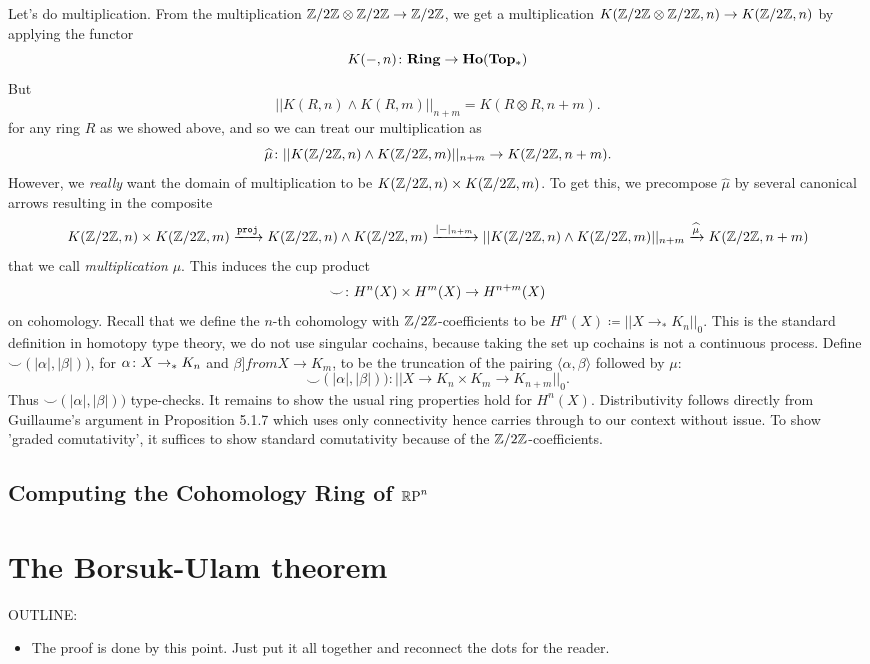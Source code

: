 \documentclass{amsart}
\begin{document}
Let's do
multiplication. From the multiplication
$ \mathbb{Z}/2\mathbb{Z} \otimes \mathbb{Z}/2\mathbb{Z} \to \mathbb{Z}/2\mathbb{Z} $, we get a multiplication
$ K(\mathbb{Z}/2\mathbb{Z} \otimes \mathbb{Z}/2\mathbb{Z}, n)\to K(\mathbb{Z}/2\mathbb{Z}, n) $ by applying the
functor
\[
K(-,n) \colon \mathbf{Ring} \to \mathbf{Ho}(\mathbf{Top_\ast})
\]
But
\[
|| K(R,n) \wedge K(R,m) ||_{n+m} =
K (R \otimes R, n+m ).
\]
for any ring $ R $ as we showed above, and so we can treat our multiplication as
\[
\widehat{\mu} \colon
|| K(\mathbb{Z}/2\mathbb{Z},n) \wedge K(\mathbb{Z}/2\mathbb{Z},m) ||_{n+m} \to K(\mathbb{Z}/2\mathbb{Z}, n+m).
\]
However, we \emph{really} want the domain of multiplication
to be $ K ( \mathbb{Z}/2\mathbb{Z} , n) \times K( \mathbb{Z}/2\mathbb{Z}, m) $. To get this, we
precompose $ \widehat{\mu} $ by several canonical arrows
resulting in the composite
\[
K (\mathbb{Z}/2\mathbb{Z} , n) \times K(\mathbb{Z}/2\mathbb{Z}, m)
\xrightarrow{\mathtt{proj}}
K (\mathbb{Z}/2\mathbb{Z} , n) \wedge K(\mathbb{Z}/2\mathbb{Z}, m)
\xrightarrow{|-|_{n+m}}
|| K (\mathbb{Z}/2\mathbb{Z} , n) \wedge K(\mathbb{Z}/2\mathbb{Z}, m) ||_{n+m}
\xrightarrow{\widehat{\mu}}
K(\mathbb{Z}/2\mathbb{Z}, n+m)
\]
that we call \emph{multiplication} $ \mu $.  This induces
the cup product
\[
\smile \colon H^n(X) \times H^m(X) \to H^{n+m}(X)
\]
on cohomology. Recall that we define the $ n $-th cohomology
with $ \mathbb{Z}/2\mathbb{Z} $-coefficients to be
$ H^n (X) \coloneqq || X \to_\ast K_n ||_0 $. This is the
standard definition in homotopy type theory, we do not use
singular cochains, because taking the set up cochains is not
a continuous process. Define
$ \smile ( |\alpha|, |\beta|) ) $, for
$ \alpha \colon X \to_\ast K_n $ and
$ \beta ]from X \to K_m $, to be the truncation of the
pairing $ \langle \alpha, \beta \rangle $ followed by $ \mu $:
\[
\smile ( |\alpha|, |\beta|) ) :
|| X \to K_n \times K_m \to K_{n+m} ||_0.
\]
Thus $ \smile ( |\alpha|, |\beta|) ) $ type-checks. It
remains to show the usual ring properties hold for $ H^n(X)
$.  Distributivity follows directly from Guillaume's
argument in Proposition 5.1.7 which uses only connectivity
hence carries through to our context without issue.  To show
'graded comutativity', it suffices to show standard
comutativity because of the $ \mathbb{Z}/2\mathbb{Z} $-coefficients.  





\subsection{Computing the Cohomology Ring of $\mathbb{R}\textrm{P}^n$}




\section{The Borsuk-Ulam theorem}
\label{sec:borsuk-ulam}

OUTLINE:
\begin{itemize}
\item
  The proof is done by this point. Just put it all
  together and reconnect the dots for the reader.
\end{itemize}



\nocite{shul:bfp,brunerie:thesis,br:rp-hott}

\end{document}
